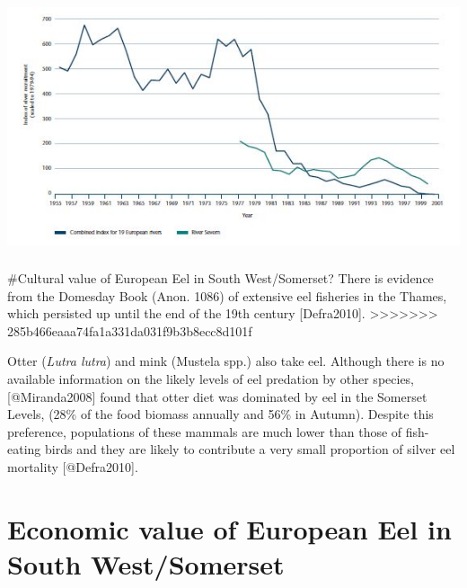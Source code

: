 \documentclass[]{article}
\begin{document}
\hypertarget{figure-2-comparison-of-european-eel-data-from-19-indicator-rivers-and-the-river-severn.-taken-from-pg.-66-of-our-nations-fisheries-environment-agency}{%
\section{\texorpdfstring{\protect\includegraphics{Capture_OurNation'sFisheriespg.66.jpg}}{Figure 2: Comparison of European Eel data from 19 indicator rivers and the River Severn. Taken from pg. 66 of `Our Nation's Fisheries', Environment Agency}}\label{figure-2-comparison-of-european-eel-data-from-19-indicator-rivers-and-the-river-severn.-taken-from-pg.-66-of-our-nations-fisheries-environment-agency}}

\#Cultural value of European Eel in South West/Somerset? There is
evidence from the Domesday Book (Anon. 1086) of extensive eel fisheries
in the Thames, which persisted up until the end of the 19th century
{[}Defra2010{]}.
\textgreater{}\textgreater{}\textgreater{}\textgreater{}\textgreater{}\textgreater{}\textgreater{}
285b466eaaa74fa1a331da031f9b3b8ecc8d101f

Otter (\emph{Lutra lutra}) and mink (Mustela spp.) also take eel.
Although there is no available information on the likely levels of eel
predation by other species, {[}@Miranda2008{]} found that otter diet was
dominated by eel in the Somerset Levels, (28\% of the food biomass
annually and 56\% in Autumn). Despite this preference, populations of
these mammals are much lower than those of fish-eating birds and they
are likely to contribute a very small proportion of silver eel mortality
{[}@Defra2010{]}.

\hypertarget{economic-value-of-european-eel-in-south-westsomerset}{%
\section{Economic value of European Eel in South
West/Somerset}\label{economic-value-of-european-eel-in-south-westsomerset}}
\end{document}
